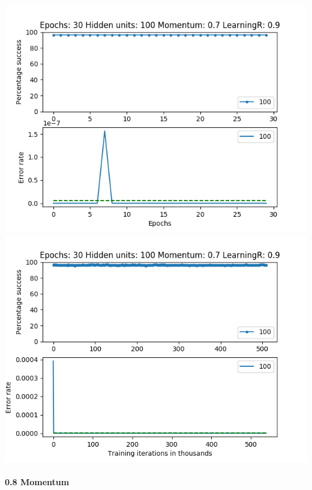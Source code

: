 \documentclass[11pt]{article}
\makeatletter
\def\maxwidth{\ifdim\Gin@nat@width>\linewidth\linewidth
    \else\Gin@nat@width\fi}
\let\Oldincludegraphics\includegraphics
\renewcommand{\includegraphics}[1]{\Oldincludegraphics[width=.8\maxwidth]{#1}}
\makeatother
\begin{document}
\includegraphics{Experiment1/E1_NN_Epoch_Momentum_0.7_30Epochs_100_LR_0.9_Hiddenunits.png}
\includegraphics{Experiment1/E1_NN_Training_Momentum_0.7_30Epochs_100_LR_0.9_Hiddenunits.png}

\hypertarget{momentum-8}{%
\paragraph{0.8 Momentum}\label{momentum-8}}
\end{document}
